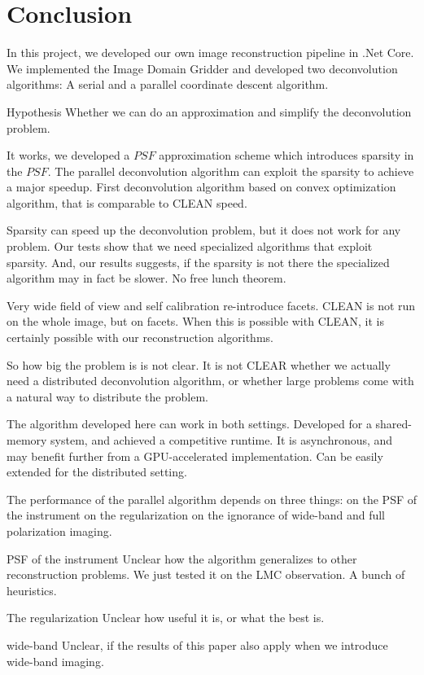 \section{Conclusion}
In this project, we developed our own image reconstruction pipeline in .Net Core. We implemented the Image Domain Gridder\cite{veenboer2017image} and developed two deconvolution algorithms: A serial and a parallel coordinate descent algorithm.

Hypothesis
Whether we can do an approximation and simplify the deconvolution problem.

It works, we developed a $PSF$ approximation scheme which introduces sparsity in the $PSF$. The parallel deconvolution algorithm can exploit the sparsity to achieve a major speedup.
First deconvolution algorithm based on convex optimization algorithm, that is comparable to CLEAN speed.

Sparsity can speed up the deconvolution problem, but it does not work for any problem. Our tests show that we need specialized algorithms that exploit sparsity. And, our results suggests, if the sparsity is not there the specialized algorithm may in fact be slower. No free lunch theorem.

Very wide field of view and self calibration re-introduce facets. CLEAN is not run on the whole image, but on facets. When this is possible with CLEAN, it is certainly possible with our reconstruction algorithms.

So how big the problem is is not clear. It is not CLEAR whether we actually need a distributed deconvolution algorithm, or whether large problems come with a natural way to distribute the problem.

The algorithm developed here can work in both settings. Developed for a shared-memory system, and achieved a competitive runtime. It is asynchronous, and may benefit further from a GPU-accelerated implementation. Can be easily extended for the distributed setting.


The performance of the parallel algorithm depends on three things:
  on the PSF of the instrument
  on the regularization
  on the ignorance of wide-band and full polarization imaging.

PSF of the instrument
Unclear how the algorithm generalizes to other reconstruction problems. We just tested it on the LMC observation. A bunch of heuristics.

The regularization
Unclear how useful it is, or what the best is.

wide-band
Unclear, if the results of this paper also apply when we introduce wide-band imaging.



